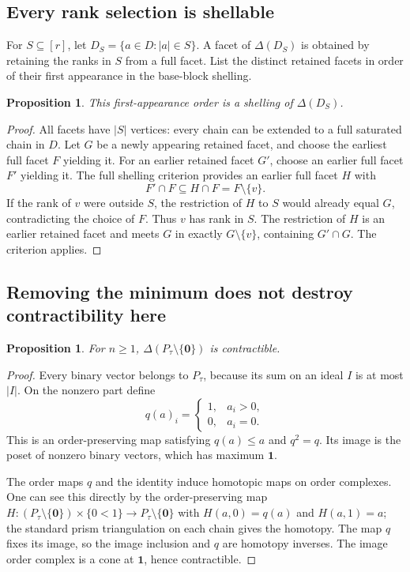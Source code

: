 \documentclass[11pt]{article}
\numberwithin{equation}{section}
\newtheorem{proposition}[theorem]{Proposition}
\theoremstyle{definition}
\theoremstyle{remark}
\newcommand{\zero}{\mathbf 0}
\newcommand{\one}{\mathbf 1}
\begin{document}
\subsection{Every rank selection is shellable}

For $S\subseteq[r]$, let $D_S=\{a\in D:|a|\in S\}$. A facet of
$\Delta(D_S)$ is obtained by retaining the ranks in $S$ from a full facet.
List the distinct retained facets in order of their first appearance in the
base-block shelling.

\begin{proposition}
\label{prop:rankselection}
This first-appearance order is a shelling of $\Delta(D_S)$.
\end{proposition}

\begin{proof}
All facets have $|S|$ vertices: every chain can be extended to a full
saturated chain in $D$. Let $G$ be a newly appearing retained facet, and
choose the earliest full facet $F$ yielding it. For an earlier retained facet
$G'$, choose an earlier full facet $F'$ yielding it. The full shelling
criterion provides an earlier full facet $H$ with
\[
 F'\cap F\subseteq H\cap F=F\setminus\{v\}.
\]
If the rank of $v$ were outside $S$, the restriction of $H$ to $S$ would
already equal $G$, contradicting the choice of $F$. Thus $v$ has rank in $S$.
The restriction of $H$ is an earlier retained facet and meets $G$ in exactly
$G\setminus\{v\}$, containing $G'\cap G$. The criterion applies.
\end{proof}

\subsection{Removing the minimum does not destroy contractibility here}

\begin{proposition}
\label{prop:contractible}
For $n\ge1$, $\Delta(P_\tau\setminus\{\zero\})$ is contractible.
\end{proposition}

\begin{proof}
Every binary vector belongs to $P_\tau$, because its sum on an ideal $I$ is
at most $|I|$. On the nonzero part define
\[
 q(a)_i=\begin{cases}1,&a_i>0,\\0,&a_i=0.\end{cases}
\]
This is an order-preserving map satisfying $q(a)\le a$ and $q^2=q$. Its image
is the poset of nonzero binary vectors, which has maximum $\one$.

The order maps $q$ and the identity induce homotopic maps on order complexes.
One can see this directly by the order-preserving map
$H:(P_\tau\setminus\{\zero\})\times\{0<1\}\to
P_\tau\setminus\{\zero\}$ with $H(a,0)=q(a)$ and $H(a,1)=a$; the standard
prism triangulation on each chain gives the homotopy. The map $q$ fixes its
image, so the image inclusion and $q$ are homotopy inverses. The image order
complex is a cone at $\one$, hence contractible.
\end{proof}
\end{document}
